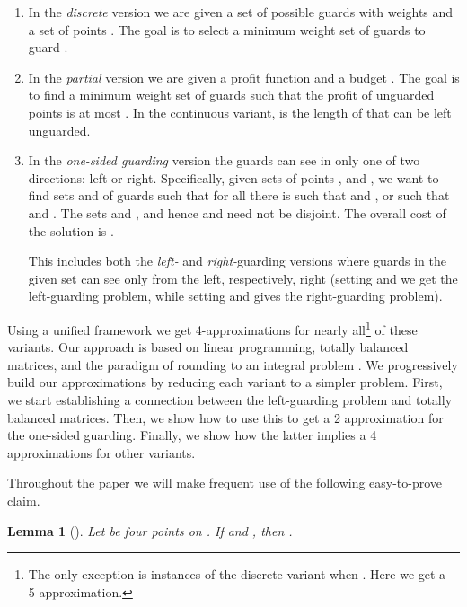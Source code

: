 \documentclass[11pt]{article}
\newtheorem{lemma}{Lemma}
\begin{document}
\begin{enumerate}
  \item In the \emph{discrete} version we are given a set of possible
  guards  with weights  and a set of
  points . The goal is to select a minimum weight set of
  guards  to guard .

  \item In the \emph{partial} version we are given a profit function  and a budget . The goal is to find a minimum weight set of
  guards such that the profit of unguarded points is at most . In the
  continuous variant,  is the length of  that can be left unguarded.

  \item In the \emph{one-sided guarding} version the guards can see in only one
  of two directions: left or right. Specifically, given  sets of points ,  and ,
  we want to find sets  and  of guards
  such that for all  there is  such that  and , or  such that  and . The sets 
  and , and hence  and  need not be disjoint. The overall cost of the solution
  is .

  This includes both the \emph{left-} and {\em right-}guarding versions
  where guards in the given set  can see only from the left, respectively, right
  (setting  and  we get the left-guarding problem, while
  setting  and  gives the right-guarding problem).
\end{enumerate}

Using a unified framework we get 4-approximations for nearly all\footnote{The
  only exception is instances of the discrete variant when . Here we get a 5-approximation.} of these variants.  Our approach
is based on linear programming, totally balanced matrices, and the paradigm of
rounding to an integral problem
\cite{journals/jal/GaurIK02,journals/orl/HassinS08}. We progressively build
our approximations by reducing each variant to a simpler problem. First, we
start establishing a connection between the left-guarding problem and totally
balanced matrices. Then, we show how to use this to get a 2 approximation for
the one-sided guarding. Finally, we show how the latter implies a 4
approximations for other variants.

Throughout the paper we will make frequent use of the following easy-to-prove
claim.

\begin{lemma}[\cite{journals/siamcomp/Ben-MosheKM07}] \label{lem:Mitchell}
  Let  be four points on . If  and ,
  then .
\end{lemma}
\end{document}
